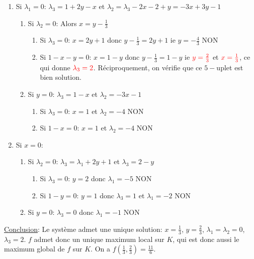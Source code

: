 \documentclass{report}
\begin{document}
\begin{enumerate}
\item Si $\lambda_1=0$:\newline
$\lambda_3 = 1+2y-x$ et $\lambda_2 = \lambda_3 - 2x-2+y = -3x+3y-1$
\begin{enumerate}
\item Si $\lambda_2=0$: \newline
Alors $x=y-\frac 13$
\begin{enumerate}
\item Si $\lambda_3=0$:\newline
$x=2y+1$ donc $y-\frac 13 = 2y+1$ ie $y=-\frac 43$ \quad NON
\item Si $1-x-y=0$:\newline
$x=1-y$ donc $y-\frac 13=1-y$ ie $\color{red}{y=\frac 23}$ et $\color{red}{x=\frac 13}$, ce qui donne $\color{red}{\lambda_3=2}$. Réciproquement, on vérifie que ce $5-$uplet est bien solution.
\end{enumerate}
\item Si $y=0$: \newline
$\lambda_3=1-x$ et $\lambda_2=-3x-1$
\begin{enumerate}
\item Si $\lambda_3=0$:\newline
$x=1$ et $\lambda_2=-4$ NON
\item Si $1-x=0$: \newline
$x=1$ et $\lambda_2=-4$ NON
\end{enumerate}
\end{enumerate}
\item Si $x=0$:
\begin{enumerate}
\item Si $\lambda_2 = 0$: \newline
$\lambda_3=\lambda_1+2y+1$ et $\lambda_3=2-y$
\begin{enumerate}
\item Si $\lambda_3 = 0$:\newline
$y=2$ donc $\lambda_1=-5$ NON
\item Si $1-y=0$:\newline
$y=1$ donc $\lambda_3=1$ et $\lambda_1=-2$ NON
\end{enumerate}
\item Si $y=0$: \newline
$\lambda_3=0$ donc $\lambda_1=-1$ NON
\end{enumerate}
\end{enumerate}
\underline{Conclusion}: Le système admet une unique solution: $x=\frac 13$, $y=\frac 23$, $\lambda_1=\lambda_2=0$, $\lambda_3=2$. $f$ admet donc un unique maximum local sur $K$, qui est donc aussi le maximum global de $f$ sur $K$. On a $f(\frac 13, \frac 23)=\frac{11}6$.
\end{document}
